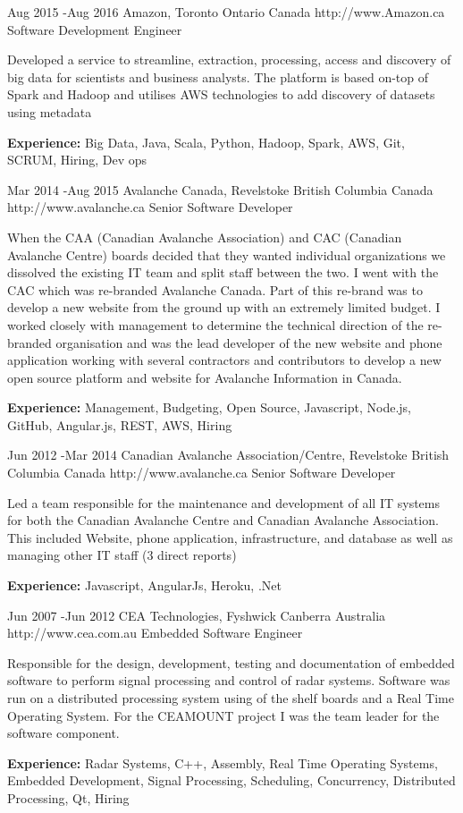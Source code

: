 \documentclass{article}
\begin{document}
\begin{job}
{Aug 2015 -}{Aug 2016}
{Amazon, Toronto Ontario Canada}
{http://www.Amazon.ca}
{Software Development Engineer}%
{Developed a service to streamline, extraction, processing, access and discovery of big data for scientists and business analysts. The platform is based on-top of Spark and Hadoop and utilises AWS technologies to add discovery of datasets using metadata \\
\rule{0mm}{5mm}\textbf{Experience:} Big Data, Java, Scala, Python, Hadoop, Spark, AWS, Git, SCRUM, Hiring, Dev ops}
\end{job}

\begin{job}
{Mar 2014 -}{Aug 2015}
{Avalanche Canada, Revelstoke British Columbia Canada}
{http://www.avalanche.ca}
{Senior Software Developer}%
{When the CAA (Canadian Avalanche Association) and CAC (Canadian Avalanche Centre) boards decided that they wanted individual organizations we dissolved the existing IT team and split staff between the two. I went with the CAC which was re-branded Avalanche Canada. Part of this re-brand was to develop a new website from the ground up with an extremely limited budget. I worked closely with management to determine the technical direction of the re-branded organisation and was the lead developer of the new website and phone application working with several contractors and contributors to develop a new open source platform and website for Avalanche Information in Canada. \\
\rule{0mm}{5mm}\textbf{Experience:} Management, Budgeting, Open Source, Javascript, Node.js, GitHub, Angular.js, REST, AWS, Hiring }
\end{job}

\begin{job}
{Jun 2012 -}{Mar 2014}
{Canadian Avalanche Association/Centre, Revelstoke British Columbia Canada}
{http://www.avalanche.ca}
{Senior Software Developer}%
{Led a team responsible for the maintenance and development of all IT systems for both the Canadian Avalanche Centre and Canadian Avalanche Association. This included Website, phone application, infrastructure, and database as well as managing other IT staff (3 direct reports)\\
\rule{0mm}{5mm}\textbf{Experience:} Javascript, AngularJs, Heroku, .Net} 
\end{job}

\begin{job}
{Jun 2007 -}{Jun 2012}
{CEA Technologies, Fyshwick Canberra Australia}
{http://www.cea.com.au}
{Embedded Software Engineer}%
{Responsible for the design, development, testing and documentation of embedded software to perform signal processing and control of radar systems. Software was run on a distributed processing system using of the shelf boards and a Real Time Operating System. For the CEAMOUNT project I was the team leader for the software component.\\
\rule{0mm}{5mm}\textbf{Experience:} Radar Systems, C++, Assembly, Real Time Operating Systems, Embedded Development, Signal Processing, Scheduling, Concurrency, Distributed Processing, Qt, Hiring} 
\end{job}
\end{document}
